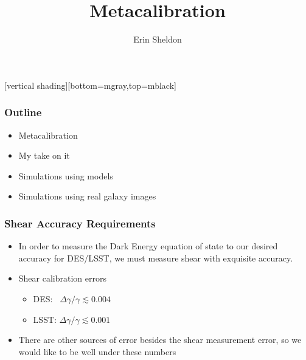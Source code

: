 \documentclass{beamer}
\title{Metacalibration}
\author{Erin Sheldon}
\institute{Brookhaven National Laboratory}
\begin{document}
\frame{\titlepage}


[vertical shading][bottom=mgray,top=mblack]

\frame
{
    \frametitle{Outline}

 
    \begin{itemize}

        \item Metacalibration

        \item My take on it

        \item Simulations using models

        \item Simulations using real galaxy images

    \end{itemize}

}

\frame
{
    \frametitle{Shear Accuracy Requirements}

 
    \begin{itemize}

        \item In order to measure the Dark Energy equation of state
            to our desired accuracy for DES/LSST, we must measure
            shear with exquisite accuracy.

        \item Shear calibration errors
            \begin{itemize}
            
                \item {\color{cyan} DES}:~ $\Delta \gamma/\gamma \lesssim 0.004$
                \item {\color{green} LSST}: $\Delta \gamma/\gamma \lesssim 0.001$

            \end{itemize}

        \item There are other sources of error besides the shear
            measurement error, so we would like to be well under
            these numbers

    \end{itemize}

}
\end{document}
